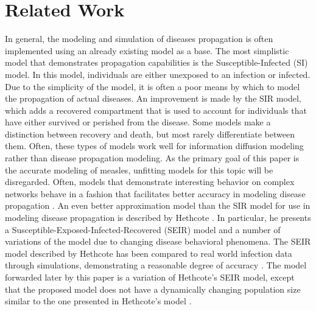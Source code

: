 \documentclass[conference]{IEEEtran}
\begin{document}
\section{Related Work} %
In general, the modeling and simulation of diseases propagation is often implemented using an already existing model as a base. The most simplistic model that demonstrates propagation capabilities is the Susceptible-Infected (SI) model. In this model, individuals are either unexposed to an infection or infected. Due to the simplicity of the model, it is often a poor means by which to model the propagation of actual diseases. An improvement is made by the SIR model, which adds a recovered compartment that is used to account for individuals that have either survived or perished from the disease. Some models make a distinction between recovery and death, but most rarely differentiate between them. Often, these types of models work well for information diffusion modeling \cite{Tambuscio15} rather than disease propagation modeling. As the primary goal of this paper is the accurate modeling of measles, unfitting models for this topic will be disregarded. Often, models that demonstrate interesting behavior on complex networks behave in a fashion that facilitates better accuracy in modeling disease propagation \cite{Hethcote2000TheMO,Pastor_satorras2014}. An even better approximation model than the SIR model for use in modeling disease propagation is described by Hethcote \cite{Hethcote2000TheMO}. In particular, he presents a Susceptible-Exposed-Infected-Recovered (SEIR) model and a number of variations of the model due to changing disease behavioral phenomena. The SEIR model described by Hethcote has been compared to real world infection data through simulations, demonstrating a reasonable degree of accuracy \cite{Montalan19}. The model forwarded later by this paper is a variation of Hethcote's SEIR model, except that the proposed model does not have a dynamically changing population size similar to the one presented in Hethcote's model \cite{Hethcote2000TheMO}.
\end{document}
